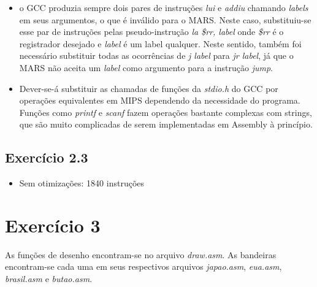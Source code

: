 \documentclass[12pt, a4paper, twoside]{article}
\begin{document}
\begin{itemize}
    \item o GCC produzia sempre dois pares de instruções \textit{lui} e \textit{addiu} chamando \textit{labels} em seus argumentos, o que é inválido para o MARS. Neste caso, substituiu-se esse par de instruções pelas pseudo-instrução \textit{la \$rr, label} onde \textit{\$rr} é o registrador desejado e \textit{label} é um label qualquer. Neste sentido, também foi necessário substituir todas as ocorrências de \textit{j label} para \textit{jr label}, já que o MARS não aceita um \textit{label} como argumento para a instrução \textit{jump}.
    \item Dever-se-á substituir as chamadas de funções da \textit{stdio.h} do GCC por operações equivalentes em MIPS dependendo da necessidade do programa. Funções como \textit{printf} e \textit{scanf} fazem operações bastante complexas com strings, que são muito complicadas de serem implementadas em Assembly à princípio.
\end{itemize}

\subsection{Exercício 2.3}


\begin{itemize}
    \item Sem otimizações: 1840 instruções
\end{itemize}

\section{Exercício 3}

As funções de desenho encontram-se no arquivo \textit{draw.asm}. As bandeiras encontram-se cada uma em seus respectivos arquivos \textit{japao.asm}, \textit{eua.asm}, \textit{brasil.asm} e \textit{butao.asm}.
\end{document}
